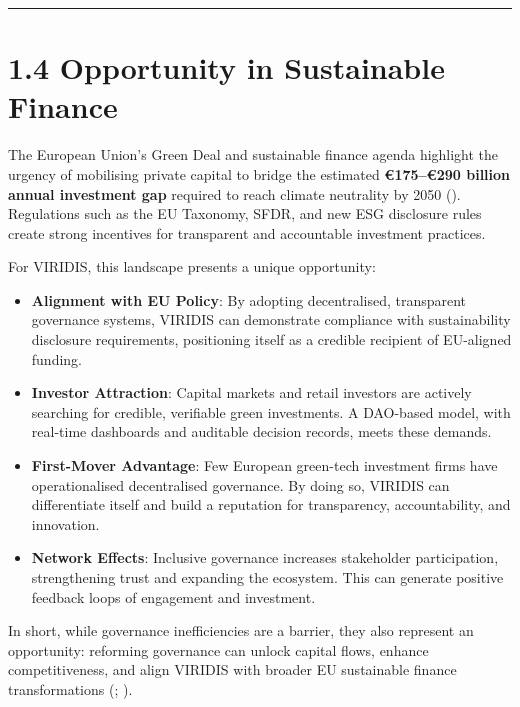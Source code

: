 \documentclass[
  english,
  12pt,
  oneside,
  open=any]{scrbook}
\providecommand{\tightlist}{%
  \setlength{\itemsep}{0pt}\setlength{\parskip}{0pt}}\usepackage{longtable,booktabs,array}
\begin{document}
\begin{center}\rule{0.5\linewidth}{0.5pt}\end{center}

\section{1.4 Opportunity in Sustainable Finance}\label{sec-opportunity}

The European Union's Green Deal and sustainable finance agenda highlight
the urgency of mobilising private capital to bridge the estimated
\textbf{€175--€290 billion annual investment gap} required to reach
climate neutrality by 2050
(). Regulations such as the EU Taxonomy, SFDR, and new ESG
disclosure rules create strong incentives for transparent and
accountable investment practices.

For VIRIDIS, this landscape presents a unique opportunity:

\begin{itemize}
\tightlist
\item
  \textbf{Alignment with EU Policy}: By adopting decentralised,
  transparent governance systems, VIRIDIS can demonstrate compliance
  with sustainability disclosure requirements, positioning itself as a
  credible recipient of EU-aligned funding.\\
\item
  \textbf{Investor Attraction}: Capital markets and retail investors are
  actively searching for credible, verifiable green investments. A
  DAO-based model, with real-time dashboards and auditable decision
  records, meets these demands.\\
\item
  \textbf{First-Mover Advantage}: Few European green-tech investment
  firms have operationalised decentralised governance. By doing so,
  VIRIDIS can differentiate itself and build a reputation for
  transparency, accountability, and innovation.\\
\item
  \textbf{Network Effects}: Inclusive governance increases stakeholder
  participation, strengthening trust and expanding the ecosystem. This
  can generate positive feedback loops of engagement and investment.
\end{itemize}

In short, while governance inefficiencies are a barrier, they also
represent an opportunity: reforming governance can unlock capital flows,
enhance competitiveness, and align VIRIDIS with broader EU sustainable
finance transformations
(;
).
\end{document}
